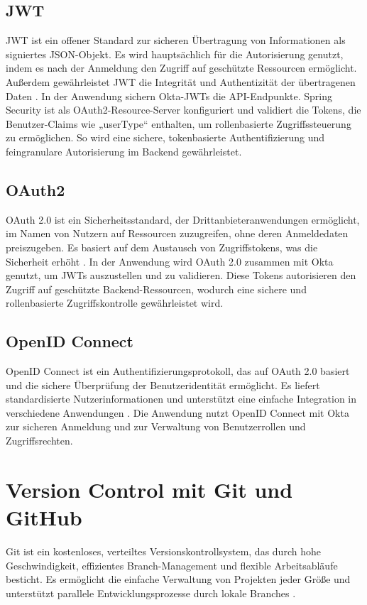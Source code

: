 \subsection{JWT}

JWT ist ein offener Standard zur sicheren Übertragung von Informationen als signiertes JSON-Objekt. Es wird hauptsächlich für die Autorisierung genutzt, indem es nach der Anmeldung den Zugriff auf geschützte Ressourcen ermöglicht. Außerdem gewährleistet JWT die Integrität und Authentizität der übertragenen Daten \cite{JWT2025}. In der Anwendung sichern Okta-JWTs die API-Endpunkte. Spring Security ist als OAuth2-Resource-Server konfiguriert und validiert die Tokens, die Benutzer-Claims wie „userType“ enthalten, um rollenbasierte Zugriffssteuerung zu ermöglichen. So wird eine sichere, tokenbasierte Authentifizierung und feingranulare Autorisierung im Backend gewährleistet.


\subsection{OAuth2}
OAuth 2.0 ist ein Sicherheitsstandard, der Drittanbieteranwendungen ermöglicht, im Namen von Nutzern auf Ressourcen zuzugreifen, ohne deren Anmeldedaten preiszugeben. Es basiert auf dem Austausch von Zugriffstokens, was die Sicherheit erhöht \cite{OAUTH22025}. In der Anwendung wird OAuth 2.0 zusammen mit Okta genutzt, um JWTs auszustellen und zu validieren. Diese Tokens autorisieren den Zugriff auf geschützte Backend-Ressourcen, wodurch eine sichere und rollenbasierte Zugriffskontrolle gewährleistet wird.

\subsection{OpenID Connect}
OpenID Connect ist ein Authentifizierungsprotokoll, das auf OAuth 2.0 basiert und die sichere Überprüfung der Benutzeridentität ermöglicht. Es liefert standardisierte Nutzerinformationen und unterstützt eine einfache Integration in verschiedene Anwendungen \cite{OPENID2025}. Die Anwendung nutzt OpenID Connect mit Okta zur sicheren Anmeldung und zur Verwaltung von Benutzerrollen und Zugriffsrechten.

\section{Version Control mit Git und GitHub}

Git ist ein kostenloses, verteiltes Versionskontrollsystem, das durch hohe Geschwindigkeit, effizientes Branch-Management und flexible Arbeitsabläufe besticht. Es ermöglicht die einfache Verwaltung von Projekten jeder Größe und unterstützt parallele Entwicklungsprozesse durch lokale Branches \cite{GIT2025}.

